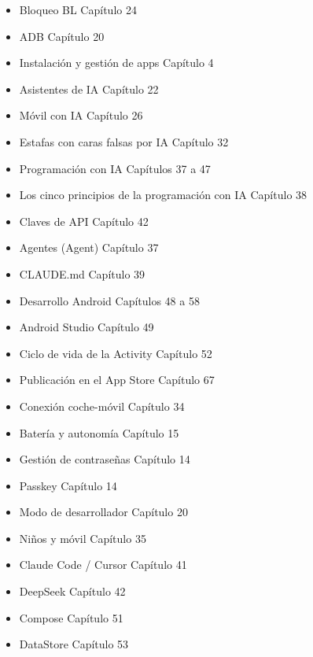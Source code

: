 


\begin{itemize}
  \item Bloqueo BL Capítulo 24
  \item ADB Capítulo 20
  \item Instalación y gestión de apps Capítulo 4
  \item Asistentes de IA Capítulo 22
  \item Móvil con IA Capítulo 26
  \item Estafas con caras falsas por IA Capítulo 32
  \item Programación con IA Capítulos 37 a 47
  \item Los cinco principios de la programación con IA Capítulo 38
  \item Claves de API Capítulo 42
  \item Agentes (Agent) Capítulo 37
  \item CLAUDE.md Capítulo 39
  \item Desarrollo Android Capítulos 48 a 58
  \item Android Studio Capítulo 49
  \item Ciclo de vida de la Activity Capítulo 52
  \item Publicación en el App Store Capítulo 67
\end{itemize}


\begin{itemize}
  \item Conexión coche-móvil Capítulo 34
  \item Batería y autonomía Capítulo 15
  \item Gestión de contraseñas Capítulo 14
  \item Passkey Capítulo 14
  \item Modo de desarrollador Capítulo 20
  \item Niños y móvil Capítulo 35
  \item Claude Code / Cursor Capítulo 41
  \item DeepSeek Capítulo 42
  \item Compose Capítulo 51
  \item DataStore Capítulo 53
\end{itemize}

